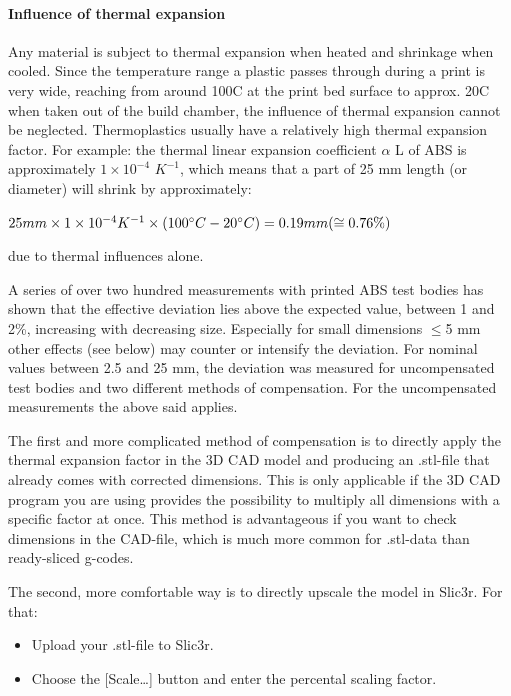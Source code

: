 \paragraph{Influence of thermal expansion}

Any material is subject to thermal expansion when heated and shrinkage when cooled. Since the temperature range a plastic passes through during a print is very wide, reaching from around 100\degree C at the print bed surface to approx. 20\degree C when taken out of the build chamber, the influence of thermal expansion cannot be neglected. Thermoplastics usually have a relatively high thermal expansion factor.
For example: the thermal linear expansion coefficient $\alpha$ L of ABS 
is approximately $1\times 10^{-4}$ $K^{-1}$, which means that a part of 25 mm length (or diameter) will shrink by approximately:

$25 mm \times 1\times10^{-4} K^{-1} \times (100\degree C - 20\degree C) = 0.19 mm (\cong 0.76 \%)$

due to thermal influences alone.

A series of over two hundred measurements with printed ABS test bodies has shown that the effective deviation lies above the expected value, between 1 and 2\%, increasing with decreasing size. Especially for small dimensions $\leq$5 mm other effects 
(see below) may counter or intensify the deviation.
For nominal values between 2.5 and 25 mm, the deviation was measured for uncompensated test bodies and two different methods of compensation.
For the uncompensated measurements the above said applies.

The first and more complicated method of compensation is to directly apply the thermal expansion factor in the 3D CAD model and producing an .stl-file that already comes with corrected dimensions. This is only applicable if the 3D CAD program you are using provides the possibility to multiply all dimensions with a specific factor at once.
This method is advantageous if you want to check dimensions in the CAD-file, which is much more common for .stl-data than ready-sliced g-codes.

The second, more comfortable way is to directly upscale the model in Slic3r.
For that: 

\begin{itemize}
  \item Upload your .stl-file to Slic3r.  
  \item Choose the [Scale…] button and enter the percental scaling factor. 
\end{itemize} 

